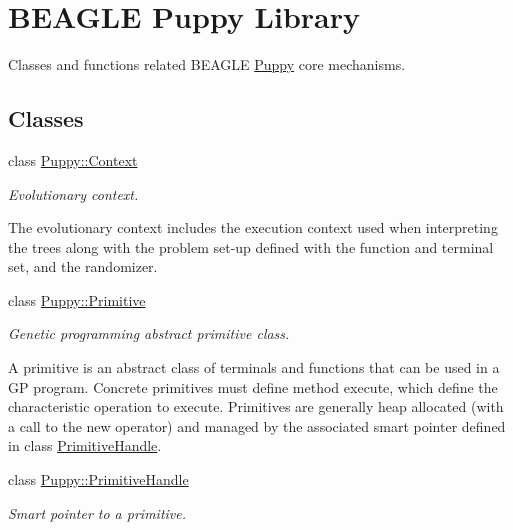 \hypertarget{group__Puppy}{}\section{B\+E\+A\+G\+L\+E Puppy Library}
\label{group__Puppy}


Classes and functions related B\+E\+A\+G\+L\+E \hyperlink{namespacePuppy}{Puppy} core mechanisms.  


\subsection*{Classes}
\begin{DoxyCompactItemize}
\item 
class \hyperlink{classPuppy_1_1Context}{Puppy\+::\+Context}
\begin{DoxyCompactList}\small\item\em Evolutionary context.

The evolutionary context includes the execution context used when interpreting the trees along with the problem set-\/up defined with the function and terminal set, and the randomizer. \end{DoxyCompactList}\item 
class \hyperlink{classPuppy_1_1Primitive}{Puppy\+::\+Primitive}
\begin{DoxyCompactList}\small\item\em Genetic programming abstract primitive class.

A primitive is an abstract class of terminals and functions that can be used in a G\+P program. Concrete primitives must define method execute, which define the characteristic operation to execute. Primitives are generally heap allocated (with a call to the new operator) and managed by the associated smart pointer defined in class \hyperlink{classPuppy_1_1PrimitiveHandle}{Primitive\+Handle}. \end{DoxyCompactList}\item 
class \hyperlink{classPuppy_1_1PrimitiveHandle}{Puppy\+::\+Primitive\+Handle}
\begin{DoxyCompactList}\small\item\em Smart pointer to a primitive.


\end{DoxyCompactList}
\end{DoxyCompactItemize}
